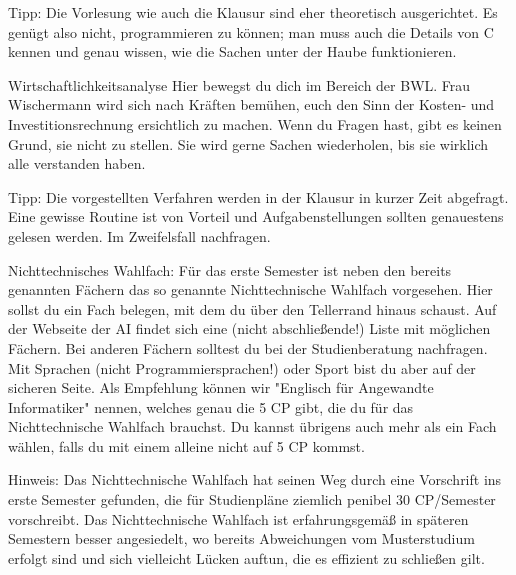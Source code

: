 Tipp: Die Vorlesung wie auch die Klausur sind eher theoretisch ausgerichtet. Es genügt also nicht, programmieren zu können; man muss auch die Details von C kennen und genau wissen, wie die Sachen unter der Haube funktionieren.

Wirtschaftlichkeitsanalyse
Hier bewegst du dich im Bereich der BWL. Frau Wischermann wird sich nach Kräften bemühen, euch den Sinn der Kosten- und Investitionsrechnung ersichtlich zu machen. Wenn du Fragen hast, gibt es keinen Grund, sie nicht zu stellen. Sie wird gerne Sachen wiederholen, bis sie wirklich alle verstanden haben.

Tipp: Die vorgestellten Verfahren werden in der Klausur in kurzer Zeit abgefragt. Eine gewisse Routine ist von Vorteil und Aufgabenstellungen sollten genauestens gelesen werden. Im Zweifelsfall nachfragen.

Nichttechnisches Wahlfach:
Für das erste Semester ist neben den bereits genannten Fächern das so genannte Nichttechnische Wahlfach vorgesehen. Hier sollst du ein Fach belegen, mit dem du über den Tellerrand hinaus schaust. Auf der Webseite der AI findet sich eine (nicht abschließende!) Liste mit möglichen Fächern. Bei anderen Fächern solltest du bei der Studienberatung nachfragen. Mit Sprachen (nicht Programmiersprachen!) oder Sport bist du aber auf der sicheren Seite. Als Empfehlung können wir "Englisch für Angewandte Informatiker" nennen, welches genau die 5 CP gibt, die du für das Nichttechnische Wahlfach brauchst. Du kannst übrigens auch mehr als ein Fach wählen, falls du mit einem alleine nicht auf 5 CP kommst.

Hinweis: Das Nichttechnische Wahlfach hat seinen Weg durch eine Vorschrift ins erste Semester gefunden, die für Studienpläne ziemlich penibel 
30 CP/Semester vorschreibt. Das Nichttechnische Wahlfach ist erfahrungsgemäß in späteren Semestern besser angesiedelt, wo bereits Abweichungen vom Musterstudium erfolgt sind und sich vielleicht Lücken auftun, die es effizient zu schließen gilt. 